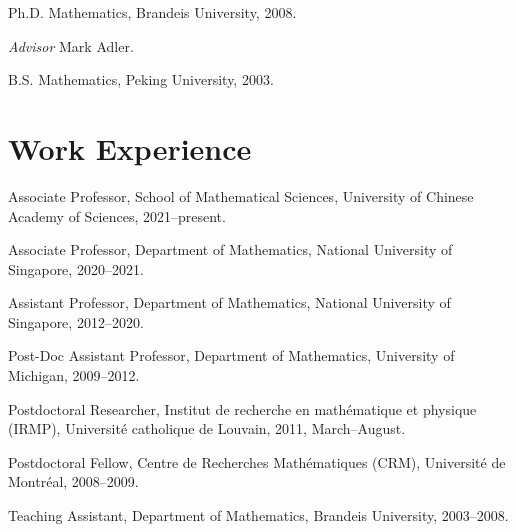 \begin{item_list}
\item Ph.D. Mathematics, Brandeis University, 2008. \cn{\\}
    \begin{item_list}
    \item \textit{Advisor }
      Mark Adler.
    \end{item_list}
  \item B.S. Mathematics, %
    Peking University, 2003. \cn{\\}
\end{item_list}

\section*{Work Experience }

\begin{item_list}
\item
  Associate Professor, School of Mathematical Sciences, University of Chinese Academy of Sciences, 2021--present. \cn{\\}
\item
  Associate Professor, Department of Mathematics, National University of Singapore, 2020--2021. \cn{\\}
\item
  Assistant Professor, Department of Mathematics, National University of Singapore, 2012--2020. \cn{\\}
\item
  Post-Doc Assistant Professor, Department of Mathematics, University of Michigan,
  2009--2012. \cn{\\}
\item
  Postdoctoral Researcher, Institut de recherche en math\'{e}matique et physique (IRMP), Universit\'{e} catholique de Louvain, 2011, March--August. \cn{\\}
\item
  Postdoctoral Fellow, Centre de Recherches Math\'{e}matiques (CRM), Universit\'{e} de Montr\'{e}al, 2008--2009. \cn{\\}
\item
  Teaching Assistant, Department of Mathematics, Brandeis University, 2003--2008. \cn{\\}
\end{item_list}

